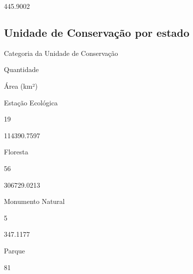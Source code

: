 \documentclass[
  letterpaper,
]{report}
\begin{document}
\n      

445.9002

\n    

\n  

\n

\hypertarget{unidade-de-conservauxe7uxe3o-por-estado}{%
\subsection{Unidade de Conservação por
estado}\label{unidade-de-conservauxe7uxe3o-por-estado}}

\n  

\n    

\n      

Categoria da Unidade de Conservação

\n      

Quantidade

\n      

Área (km²)

\n    

\n  

\n  

\n    

\n      

Estação Ecológica

\n      

19

\n      

114390.7597

\n    

\n    

\n      

Floresta

\n      

56

\n      

306729.0213

\n    

\n    

\n      

Monumento Natural

\n      

5

\n      

347.1177

\n    

\n    

\n      

Parque

\n      

81

\n      
\end{document}
